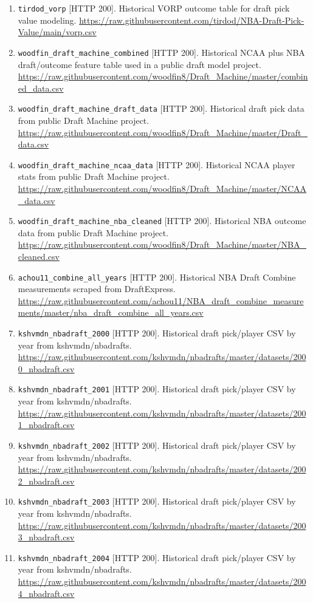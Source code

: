 \documentclass[11pt]{article}
\begin{document}
\begin{enumerate}[leftmargin=*, itemsep=2pt]
\item \texttt{tirdod\_vorp} [HTTP 200]. Historical VORP outcome table for draft pick value modeling. \url{https://raw.githubusercontent.com/tirdod/NBA-Draft-Pick-Value/main/vorp.csv}
\item \texttt{woodfin\_draft\_machine\_combined} [HTTP 200]. Historical NCAA plus NBA draft/outcome feature table used in a public draft model project. \url{https://raw.githubusercontent.com/woodfin8/Draft_Machine/master/combined_data.csv}
\item \texttt{woodfin\_draft\_machine\_draft\_data} [HTTP 200]. Historical draft pick data from public Draft Machine project. \url{https://raw.githubusercontent.com/woodfin8/Draft_Machine/master/Draft_data.csv}
\item \texttt{woodfin\_draft\_machine\_ncaa\_data} [HTTP 200]. Historical NCAA player stats from public Draft Machine project. \url{https://raw.githubusercontent.com/woodfin8/Draft_Machine/master/NCAA_data.csv}
\item \texttt{woodfin\_draft\_machine\_nba\_cleaned} [HTTP 200]. Historical NBA outcome data from public Draft Machine project. \url{https://raw.githubusercontent.com/woodfin8/Draft_Machine/master/NBA_cleaned.csv}
\item \texttt{achou11\_combine\_all\_years} [HTTP 200]. Historical NBA Draft Combine measurements scraped from DraftExpress. \url{https://raw.githubusercontent.com/achou11/NBA_draft_combine_measurements/master/nba_draft_combine_all_years.csv}
\item \texttt{kshvmdn\_nbadraft\_2000} [HTTP 200]. Historical draft pick/player CSV by year from kshvmdn/nbadrafts. \url{https://raw.githubusercontent.com/kshvmdn/nbadrafts/master/datasets/2000_nbadraft.csv}
\item \texttt{kshvmdn\_nbadraft\_2001} [HTTP 200]. Historical draft pick/player CSV by year from kshvmdn/nbadrafts. \url{https://raw.githubusercontent.com/kshvmdn/nbadrafts/master/datasets/2001_nbadraft.csv}
\item \texttt{kshvmdn\_nbadraft\_2002} [HTTP 200]. Historical draft pick/player CSV by year from kshvmdn/nbadrafts. \url{https://raw.githubusercontent.com/kshvmdn/nbadrafts/master/datasets/2002_nbadraft.csv}
\item \texttt{kshvmdn\_nbadraft\_2003} [HTTP 200]. Historical draft pick/player CSV by year from kshvmdn/nbadrafts. \url{https://raw.githubusercontent.com/kshvmdn/nbadrafts/master/datasets/2003_nbadraft.csv}
\item \texttt{kshvmdn\_nbadraft\_2004} [HTTP 200]. Historical draft pick/player CSV by year from kshvmdn/nbadrafts. \url{https://raw.githubusercontent.com/kshvmdn/nbadrafts/master/datasets/2004_nbadraft.csv}

\end{enumerate}
\end{document}
